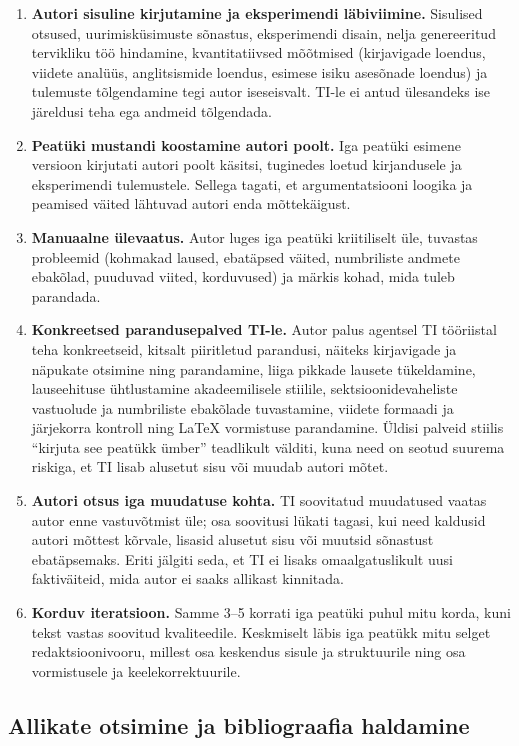\begin{enumerate}
    \item \textbf{Autori sisuline kirjutamine ja eksperimendi läbiviimine.} Sisulised otsused, uurimisküsimuste sõnastus, eksperimendi disain, nelja genereeritud tervikliku töö hindamine, kvantitatiivsed mõõtmised (kirjavigade loendus, viidete analüüs, anglitsismide loendus, esimese isiku asesõnade loendus) ja tulemuste tõlgendamine tegi autor iseseisvalt. TI-le ei antud ülesandeks ise järeldusi teha ega andmeid tõlgendada.
    \item \textbf{Peatüki mustandi koostamine autori poolt.} Iga peatüki esimene versioon kirjutati autori poolt käsitsi, tuginedes loetud kirjandusele ja eksperimendi tulemustele. Sellega tagati, et argumentatsiooni loogika ja peamised väited lähtuvad autori enda mõttekäigust.
    \item \textbf{Manuaalne ülevaatus.} Autor luges iga peatüki kriitiliselt üle, tuvastas probleemid (kohmakad laused, ebatäpsed väited, numbriliste andmete ebakõlad, puuduvad viited, korduvused) ja märkis kohad, mida tuleb parandada.
    \item \textbf{Konkreetsed parandusepalved TI-le.} Autor palus agentsel TI tööriistal teha konkreetseid, kitsalt piiritletud parandusi, näiteks kirjavigade ja näpukate otsimine ning parandamine, liiga pikkade lausete tükeldamine, lauseehituse ühtlustamine akadeemilisele stiilile, sektsioonidevaheliste vastuolude ja numbriliste ebakõlade tuvastamine, viidete formaadi ja järjekorra kontroll ning \LaTeX{} vormistuse parandamine. Üldisi palveid stiilis ``kirjuta see peatükk ümber'' teadlikult välditi, kuna need on seotud suurema riskiga, et TI lisab alusetut sisu või muudab autori mõtet.
    \item \textbf{Autori otsus iga muudatuse kohta.} TI soovitatud muudatused vaatas autor enne vastuvõtmist üle; osa soovitusi lükati tagasi, kui need kaldusid autori mõttest kõrvale, lisasid alusetut sisu või muutsid sõnastust ebatäpsemaks. Eriti jälgiti seda, et TI ei lisaks omaalgatuslikult uusi faktiväiteid, mida autor ei saaks allikast kinnitada.
    \item \textbf{Korduv iteratsioon.} Samme 3--5 korrati iga peatüki puhul mitu korda, kuni tekst vastas soovitud kvaliteedile. Keskmiselt läbis iga peatükk mitu selget redaktsioonivooru, millest osa keskendus sisule ja struktuurile ning osa vormistusele ja keelekorrektuurile.
\end{enumerate}

\subsection{Allikate otsimine ja bibliograafia haldamine} \label{subsec:allikad}

